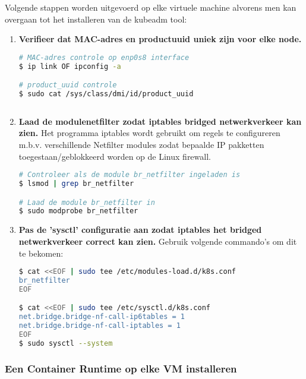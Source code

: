 Volgende stappen worden uitgevoerd op elke virtuele machine alvorens men kan overgaan tot het installeren van de kubeadm tool: 
\begin{enumerate}
    \item {\bf Verifieer dat MAC-adres en product\textunderscore uuid uniek zijn voor elke node.}
\begin{lstlisting}[language=bash]
# MAC-adres controle op enp0s8 interface
$ ip link OF ipconfig -a

# product_uuid controle 
$ sudo cat /sys/class/dmi/id/product_uuid  
   
\end{lstlisting} 

    \item {\bf Laad de module\textunderscore netfilter zodat iptables bridged netwerkverkeer kan zien.}
Het programma iptables wordt gebruikt om regels te configureren m.b.v. verschillende Netfilter modules zodat bepaalde IP pakketten toegestaan/geblokkeerd worden op de Linux firewall.
\begin{lstlisting}[language=bash]
# Controleer als de module br_netfilter ingeladen is 
$ lsmod | grep br_netfilter

# Laad de module br_netfilter in
$ sudo modprobe br_netfilter

\end{lstlisting}

    \item {\bf Pas de 'sysctl' configuratie aan zodat iptables het bridged netwerkverkeer correct kan zien.}
Gebruik volgende commando's om dit te bekomen:
\begin{lstlisting}[language=bash]
$ cat <<EOF | sudo tee /etc/modules-load.d/k8s.conf
br_netfilter
EOF

$ cat <<EOF | sudo tee /etc/sysctl.d/k8s.conf
net.bridge.bridge-nf-call-ip6tables = 1
net.bridge.bridge-nf-call-iptables = 1
EOF
$ sudo sysctl --system

\end{lstlisting}
    
\end{enumerate}


\subsubsection{Een Container Runtime op elke VM installeren}

